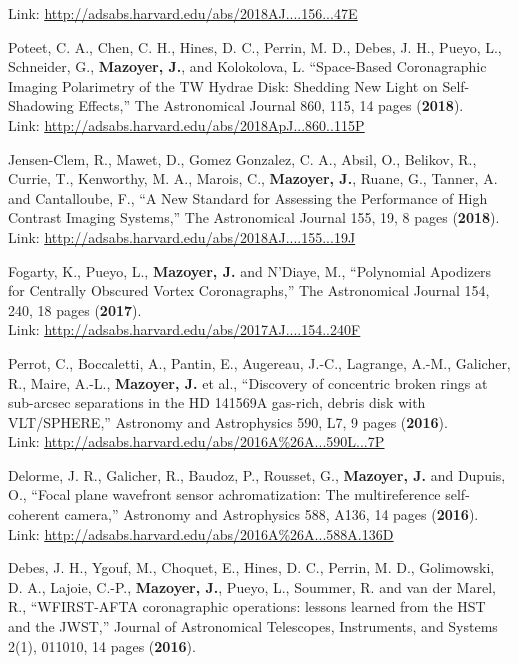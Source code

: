 \documentclass[12pt]{article}
\begin{document}
\begin{etaremune}
Link: \textcolor{BrickRed}{\underline{\url{http://adsabs.harvard.edu/abs/2018AJ....156...47E}}}
\item Poteet, C. A., Chen, C. H., Hines, D. C., Perrin, M. D., Debes, J. H., Pueyo, L., Schneider, G., \textbf{Mazoyer, J.}, and Kolokolova, L. “Space-Based Coronagraphic Imaging Polarimetry of the TW Hydrae Disk: Shedding New Light on Self-Shadowing Effects,” The Astronomical Journal 860, 115, 14 pages (\textbf{2018}).\\
Link: \textcolor{BrickRed}{\underline{\url{http://adsabs.harvard.edu/abs/2018ApJ...860..115P}}}
\item Jensen-Clem, R., Mawet, D., Gomez Gonzalez, C. A., Absil, O., Belikov, R., Currie, T., Kenworthy, M. A., Marois, C., \textbf{Mazoyer, J.}, Ruane, G., Tanner, A. and Cantalloube, F., “A New Standard for Assessing the Performance of High Contrast Imaging Systems,” The Astronomical Journal 155, 19, 8 pages (\textbf{2018}).\\
Link: \textcolor{BrickRed}{\underline{\url{http://adsabs.harvard.edu/abs/2018AJ....155...19J}}}
\item Fogarty, K., Pueyo, L., \textbf{Mazoyer, J.} and N’Diaye, M., “Polynomial Apodizers for Centrally Obscured Vortex Coronagraphs,” The Astronomical Journal 154, 240, 18 pages (\textbf{2017}).\\
Link: \textcolor{BrickRed}{\underline{\url{http://adsabs.harvard.edu/abs/2017AJ....154..240F}}}
\item Perrot, C., Boccaletti, A., Pantin, E., Augereau, J.-C., Lagrange, A.-M., Galicher, R., Maire, A.-L., \textbf{Mazoyer, J.} et al., “Discovery of concentric broken rings at sub-arcsec separations in the HD 141569A gas-rich, debris disk with VLT/SPHERE,” Astronomy and Astrophysics 590, L7, 9 pages (\textbf{2016}).\\
Link: \textcolor{BrickRed}{\underline{\url{http://adsabs.harvard.edu/abs/2016A\%26A...590L...7P}}}
\item Delorme, J. R., Galicher, R., Baudoz, P., Rousset, G., \textbf{Mazoyer, J.} and Dupuis, O., “Focal plane wavefront sensor achromatization: The multireference self-coherent camera,” Astronomy and Astrophysics 588, A136, 14 pages (\textbf{2016}).\\
Link: \textcolor{BrickRed}{\underline{\url{http://adsabs.harvard.edu/abs/2016A\%26A...588A.136D}}}
\item Debes, J. H., Ygouf, M., Choquet, E., Hines, D. C., Perrin, M. D., Golimowski, D. A., Lajoie, C.-P., \textbf{Mazoyer, J.}, Pueyo, L., Soummer, R. and van der Marel, R., “WFIRST-AFTA coronagraphic operations: lessons learned from the HST and the JWST,” Journal of Astronomical Telescopes, Instruments, and Systems 2(1), 011010, 14 pages (\textbf{2016}).\\

\end{etaremune}
\end{document}
